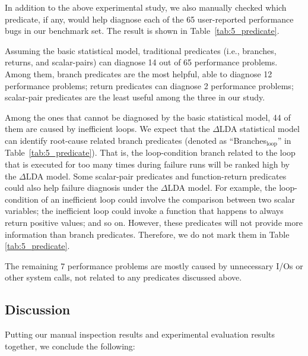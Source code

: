 In addition to the above experimental study, we also manually checked
which predicate, if any, would help diagnose each of the 65 user-reported
performance bugs in our benchmark set. The result is shown in 
Table~\ref{tab:5_predicate}. 

Assuming the basic statistical model,  
traditional predicates (i.e., branches, returns, and scalar-pairs) 
can diagnose 14 out of 65 performance 
problems. Among them,
branch predicates are the most helpful, able to diagnose 12 performance 
problems; return predicates can diagnose 2 performance problems; 
scalar-pair
predicates are the least useful among the three in our study.


Among the ones that cannot be diagnosed by the basic statistical model,
44 of them are caused by inefficient loops. We expect that the 
$\Delta$LDA statistical model can identify root-cause related branch predicates
(denoted as ``Branches$_{\text{loop}}$'' in Table~\ref{tab:5_predicate}).
That is, the loop-condition branch related to the loop that is executed for too
many times
during failure runs will be ranked high by the $\Delta$LDA model.
Some scalar-pair predicates and function-return predicates could also
help failure diagnosis under the $\Delta$LDA model. For example, the
loop-condition of an inefficient loop could involve the comparison between
two scalar variables; the inefficient loop could invoke a function that
happens to always return positive values; and so on. However, these predicates
will not provide more information than branch predicates. Therefore, we do
not mark them in Table \ref{tab:5_predicate}.

The remaining 7 performance problems are mostly caused by unnecessary I/Os
or other system calls, not related to any predicates discussed above.

\subsection{Discussion}

Putting our manual inspection results and
experimental evaluation results together, we conclude the following:

